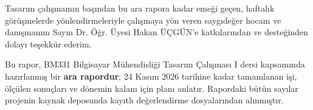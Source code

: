 
Tasarım çalışmamın başından bu ara rapora kadar emeği geçen, haftalık görüşmelerde yönlendirmeleriyle
çalışmaya yön veren saygıdeğer hocam ve danışmanım Sayın Dr. Öğr. Üyesi Hakan ÜÇGÜN'e katkılarından ve
desteğinden dolayı teşekkür ederim.

Bu rapor, BM331 Bilgisayar Mühendisliği Tasarım Çalışması I dersi kapsamında hazırlanmış bir
\textbf{ara rapordur}; 24 Kasım 2026 tarihine kadar tamamlanan işi, ölçülen sonuçları ve dönemin
kalanı için planı anlatır. Rapordaki bütün sayılar projenin kaynak deposunda kayıtlı değerlendirme
dosyalarından alınmıştır.

\imzablogu

